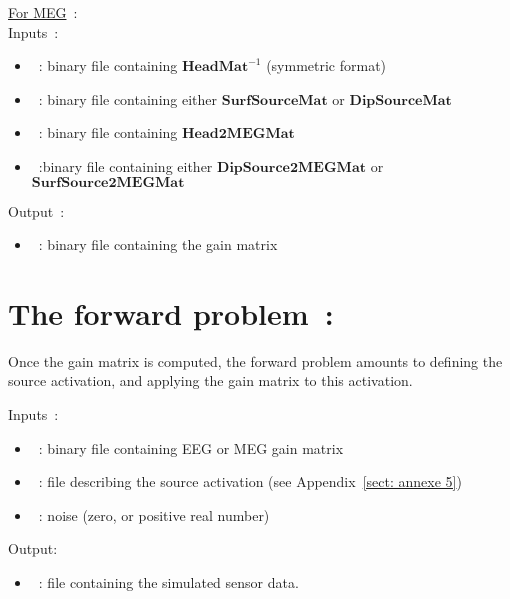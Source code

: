 \bigskip

\checkItem\underline{For MEG}~:\\
Inputs~:
\begin{itemize}
    \item {}~: binary file containing $\mathbf{HeadMat}^{-1}$ (symmetric format)
    \item {}~: binary file containing either  $\mathbf{SurfSourceMat}$ or  $\mathbf{DipSourceMat}$
    \item {}~: binary file containing $\mathbf{Head2MEGMat}$
    \item {}~:binary file containing either  $\mathbf{DipSource2MEGMat}$ or $\mathbf{SurfSource2MEGMat}$
\end{itemize}
Output~:
\begin{itemize}
    \item {}~: binary file containing the gain matrix
\end{itemize}

\medskip

\noindent
{}


\section{The forward problem~:}
\label{sect: command direct}

Once the gain matrix is computed, the forward problem amounts to defining the source activation, and applying the gain matrix to this activation.

Inputs~: 
\begin{itemize}
    \item {}~: binary file containing EEG or MEG gain matrix
    \item {}~: file describing the source activation (see Appendix~\ref{sect: annexe 5})
    \item {}~: noise (zero, or positive real number)
\end{itemize}
Output:
\begin{itemize}
    \item {}~: file containing the simulated sensor data.
\end{itemize}

\medskip

\noindent
{}
